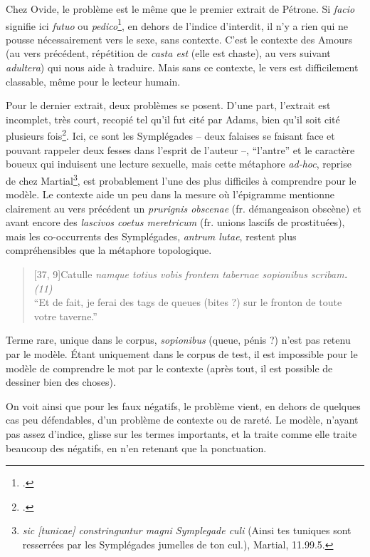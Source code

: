 Chez Ovide, le problème est le même que le premier extrait de Pétrone. Si \textit{facio} signifie ici \textit{futuo} ou \textit{pedico}\footcite[p.204]{adams}, en dehors de l'indice d'interdit, il n'y a rien qui ne pousse nécessairement vers le sexe, sans contexte. C'est le contexte des Amours (au vers précédent, répétition de \textit{casta est} (elle est chaste), au vers suivant \textit{adultera}) qui nous aide à traduire. Mais sans ce contexte, le vers est difficilement classable, même pour le lecteur humain.

Pour le dernier extrait, deux problèmes se posent. D'une part, l'extrait est incomplet, très court, recopié tel qu'il fut cité par Adams, bien qu'il soit cité plusieurs fois\footcite[pp.114, 172 et 240]{Adams}. Ici, ce sont les Symplégades -- deux falaises se faisant face et pouvant rappeler deux fesses dans l'esprit de l'auteur --, ``l'antre'' et le caractère boueux qui induisent une lecture sexuelle, mais cette métaphore \textit{ad-hoc}, reprise de chez Martial\footnote{\textit{sic {[tunicae]} constringuntur magni Symplegade culi} (Ainsi tes tuniques sont resserrées par les Symplégades jumelles de ton cul.), Martial, 11.99.5.}, est probablement l'une des plus difficiles à comprendre pour le modèle. Le contexte aide un peu dans la mesure où l'épigramme mentionne clairement au vers précédent un \textit{prurignis obscenae} (fr. démangeaison obscène) et avant encore des \textit{lascivos coetus meretricum} (fr. unions lascifs de prostituées), mais les co-occurrents des Symplégades, \textit{antrum lutae}, restent plus compréhensibles que la métaphore topologique.

\begin{quote}[37, 9]{Catulle}
    \textit{namque totius vobis frontem tabernae sopionibus scribam\textbf{.} (11)} \\
    \enquote{Et de fait, je ferai des tags de queues (bites ?) sur le fronton de toute votre taverne.}
\end{quote}

Terme rare, unique dans le corpus, \textit{sopionibus} (queue, pénis ?) n'est pas retenu par le modèle. Étant uniquement dans le corpus de test, il est impossible pour le modèle de comprendre le mot par le contexte (après tout, il est possible de dessiner bien des choses).

On voit ainsi que pour les faux négatifs, le problème vient, en dehors de quelques cas peu défendables, d'un problème de contexte ou de rareté. Le modèle, n'ayant pas assez d'indice, glisse sur les termes importants, et la traite comme elle traite beaucoup des négatifs, en n'en retenant que la ponctuation.

